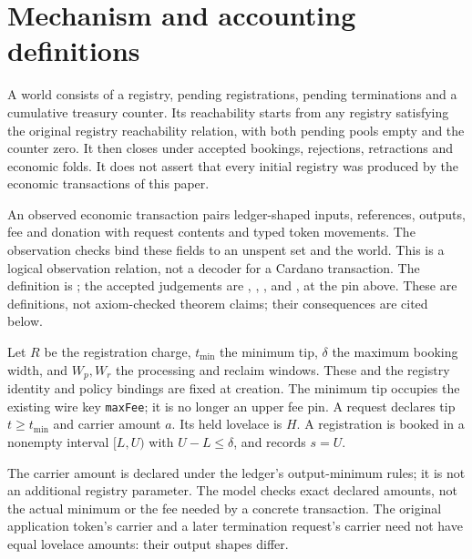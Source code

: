 \section{Mechanism and accounting definitions}
\label{sec:mechanism}
\begin{definition}
A world consists of a registry, pending registrations, pending terminations and
a cumulative treasury counter. Its reachability starts from any registry
satisfying the original registry reachability relation, with both pending pools
empty and the counter zero. It then closes under accepted bookings, rejections,
retractions and economic folds. It does not assert that every initial registry
was produced by the economic transactions of this paper.
\end{definition}
An observed economic transaction pairs ledger-shaped inputs, references,
outputs, fee and donation with request contents and typed token movements.
The observation checks bind these fields to an unspent set and the world.
This is a logical observation relation, not a decoder for a Cardano transaction.
The definition is ; the accepted judgements are
, ,
,  and
, at the pin above. These are definitions, not
axiom-checked theorem claims; their consequences are cited below.

\begin{definition}
Let $R$ be the registration charge, $t_{\min}$ the minimum tip, $\delta$ the
maximum booking width, and $W_p,W_r$ the processing and reclaim windows.
These and the registry identity and policy bindings are fixed at creation.
The minimum tip occupies the existing wire key \texttt{maxFee}; it is no
longer an upper fee pin. A request declares tip $t\ge t_{\min}$ and carrier
amount $a$. Its held lovelace is $H$. A registration is booked in a nonempty
interval $[L,U)$ with $U-L\le\delta$, and records $s=U$.
\end{definition}
The carrier amount is declared under the ledger's output-minimum rules; it
is not an additional registry parameter. The model checks exact declared
amounts, not the actual minimum or the fee needed by a concrete transaction.
The original application token's carrier and a later termination request's
carrier need not have equal lovelace amounts: their output shapes differ.


